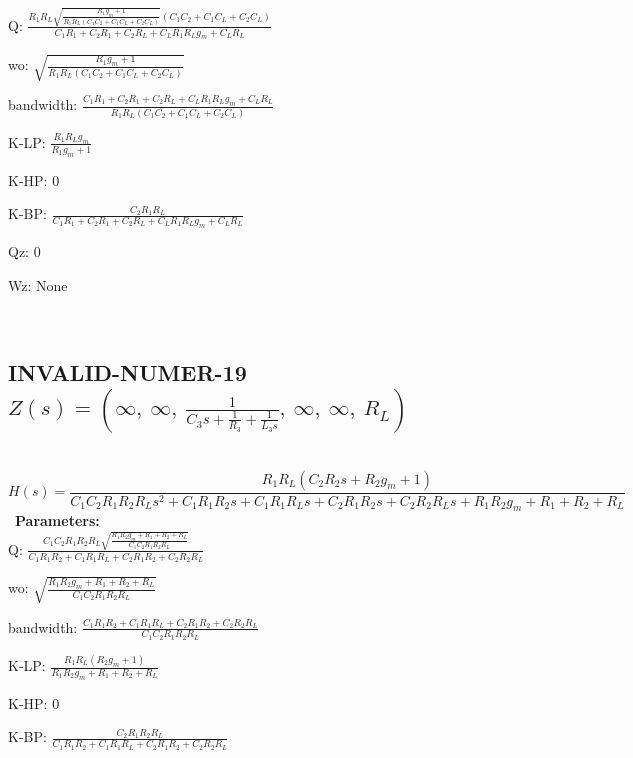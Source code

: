 \documentclass{article}
\begin{document}
Q: $\frac{R_{1} R_{L} \sqrt{\frac{R_{1} g_{m} + 1}{R_{1} R_{L} \left(C_{1} C_{2} + C_{1} C_{L} + C_{2} C_{L}\right)}} \left(C_{1} C_{2} + C_{1} C_{L} + C_{2} C_{L}\right)}{C_{1} R_{1} + C_{2} R_{1} + C_{2} R_{L} + C_{L} R_{1} R_{L} g_{m} + C_{L} R_{L}}$\ 

wo: $\sqrt{\frac{R_{1} g_{m} + 1}{R_{1} R_{L} \left(C_{1} C_{2} + C_{1} C_{L} + C_{2} C_{L}\right)}}$\ 

bandwidth: $\frac{C_{1} R_{1} + C_{2} R_{1} + C_{2} R_{L} + C_{L} R_{1} R_{L} g_{m} + C_{L} R_{L}}{R_{1} R_{L} \left(C_{1} C_{2} + C_{1} C_{L} + C_{2} C_{L}\right)}$\ 

K-LP: $\frac{R_{1} R_{L} g_{m}}{R_{1} g_{m} + 1}$\ 

K-HP: $0$\ 

K-BP: $\frac{C_{2} R_{1} R_{L}}{C_{1} R_{1} + C_{2} R_{1} + C_{2} R_{L} + C_{L} R_{1} R_{L} g_{m} + C_{L} R_{L}}$\ 

Qz: $0$\ 

Wz: $\text{None}$\ 

\ 

\subsection{INVALID-NUMER-19 $Z(s) = \left( \infty, \  \infty, \  \frac{1}{C_{3} s + \frac{1}{R_{3}} + \frac{1}{L_{3} s}}, \  \infty, \  \infty, \  R_{L}\right)$ } \ 
\textbf{\[H(s) = \frac{R_{1} R_{L} \left(C_{2} R_{2} s + R_{2} g_{m} + 1\right)}{C_{1} C_{2} R_{1} R_{2} R_{L} s^{2} + C_{1} R_{1} R_{2} s + C_{1} R_{1} R_{L} s + C_{2} R_{1} R_{2} s + C_{2} R_{2} R_{L} s + R_{1} R_{2} g_{m} + R_{1} + R_{2} + R_{L}}\] } \ 
\textbf{Parameters:}\\ 

Q: $\frac{C_{1} C_{2} R_{1} R_{2} R_{L} \sqrt{\frac{R_{1} R_{2} g_{m} + R_{1} + R_{2} + R_{L}}{C_{1} C_{2} R_{1} R_{2} R_{L}}}}{C_{1} R_{1} R_{2} + C_{1} R_{1} R_{L} + C_{2} R_{1} R_{2} + C_{2} R_{2} R_{L}}$\ 

wo: $\sqrt{\frac{R_{1} R_{2} g_{m} + R_{1} + R_{2} + R_{L}}{C_{1} C_{2} R_{1} R_{2} R_{L}}}$\ 

bandwidth: $\frac{C_{1} R_{1} R_{2} + C_{1} R_{1} R_{L} + C_{2} R_{1} R_{2} + C_{2} R_{2} R_{L}}{C_{1} C_{2} R_{1} R_{2} R_{L}}$\ 

K-LP: $\frac{R_{1} R_{L} \left(R_{2} g_{m} + 1\right)}{R_{1} R_{2} g_{m} + R_{1} + R_{2} + R_{L}}$\ 

K-HP: $0$\ 

K-BP: $\frac{C_{2} R_{1} R_{2} R_{L}}{C_{1} R_{1} R_{2} + C_{1} R_{1} R_{L} + C_{2} R_{1} R_{2} + C_{2} R_{2} R_{L}}$\ 
\end{document}
